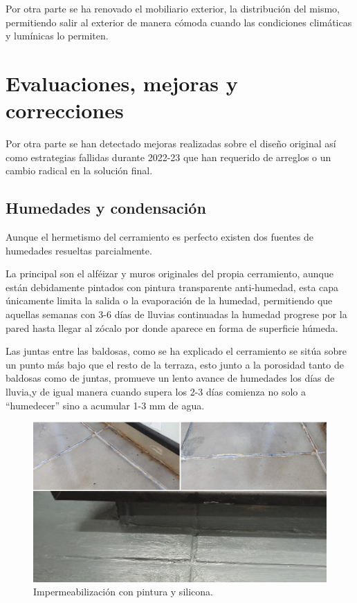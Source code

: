 Por otra parte se ha renovado el mobiliario exterior, la distribución del mismo, permitiendo salir al exterior de manera cómoda cuando las condiciones climáticas y lumínicas lo permiten.

\section{Evaluaciones, mejoras y correcciones}\label{S:cambios_2023}
Por otra parte se han detectado mejoras realizadas sobre el diseño original así como estrategias fallidas durante 2022-23 que han requerido de arreglos o un cambio radical en la solución final.

\subsection{Humedades y condensación}
Aunque el hermetismo del cerramiento es perfecto existen dos fuentes de humedades resueltas parcialmente. 

La principal son el alféizar y muros originales del propia cerramiento, aunque están debidamente pintados con pintura transparente anti-humedad, esta capa únicamente limita la salida o la evaporación de la humedad, permitiendo que aquellas semanas con 3-6 días de lluvias continuadas la humedad progrese por la pared hasta llegar al zócalo por donde aparece en forma de superficie húmeda.

Las juntas entre las baldosas, como se ha explicado el cerramiento se sitúa sobre un punto más bajo que el resto de la terraza, esto junto a la porosidad tanto de baldosas como de juntas, promueve un lento avance de humedades los días de lluvia,y de igual manera cuando supera los 2-3 días comienza no solo a “humedecer” sino a acumular 1-3 mm de agua.

\begin{figure}[!htb]
\begin{center}
\includegraphics[width=1\textwidth]{./figuras/humedades.jpg}
\caption{Impermeabilización con pintura y silicona.}
\label{F:humedades}
\end{center}
\end{figure}

